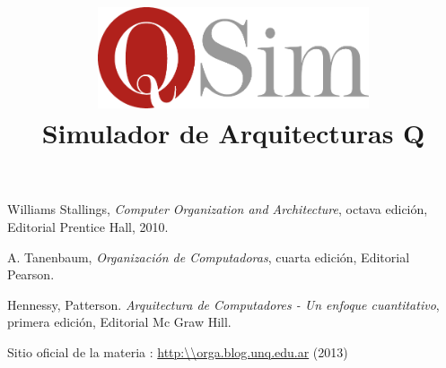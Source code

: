 \documentclass[11pt,a4paper]{book}
\author{\susi \and \tati}
\title{\includegraphics[width=8cm]{logo}\\Simulador de Arquitecturas Q}
\begin{document}
\maketitle

\newpage

\newpage
\tableofcontents

\newpage




\appendix




\newpage
\begin{thebibliography}{9}

 Williams Stallings, \emph{Computer Organization and Architecture}, octava edición, Editorial Prentice Hall, 2010.

 A. Tanenbaum, \emph{Organización de Computadoras}, cuarta edición, Editorial Pearson.

 Hennessy, Patterson. \emph{Arquitectura de Computadores - Un enfoque cuantitativo}, primera edición,  Editorial Mc Graw Hill.

 Sitio oficial de la materia \orga: \url{http:\\orga.blog.unq.edu.ar} (2013)

\end{thebibliography}
\end{document}
